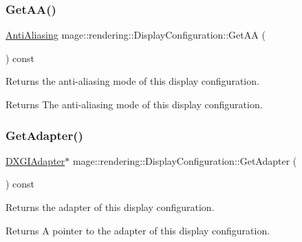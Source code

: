 \subsubsection{\texorpdfstring{Get\+A\+A()}{GetAA()}}
{\footnotesize\ttfamily \mbox{\hyperlink{namespacemage_1_1rendering_ac3f75e49e92b42f2f5fb55c450d8899c}{Anti\+Aliasing}} mage\+::rendering\+::\+Display\+Configuration\+::\+Get\+AA (\begin{DoxyParamCaption}{ }\end{DoxyParamCaption}) const\hspace{0.3cm}{\ttfamily [noexcept]}}

Returns the anti-\/aliasing mode of this display configuration.

\begin{DoxyReturn}{Returns}
The anti-\/aliasing mode of this display configuration. 
\end{DoxyReturn}
\mbox{\label{classmage_1_1rendering_1_1_display_configuration_a8516379377ff3f6cec7b2d705398459f}} 
\subsubsection{\texorpdfstring{Get\+Adapter()}{GetAdapter()}}
{\footnotesize\ttfamily \mbox{\hyperlink{namespacemage_1_1rendering_ad55e028ebd705b547eeb972ad8d03b6a}{D\+X\+G\+I\+Adapter}}$\ast$ mage\+::rendering\+::\+Display\+Configuration\+::\+Get\+Adapter (\begin{DoxyParamCaption}{ }\end{DoxyParamCaption}) const\hspace{0.3cm}{\ttfamily [noexcept]}}

Returns the adapter of this display configuration.

\begin{DoxyReturn}{Returns}
A pointer to the adapter of this display configuration. 
\end{DoxyReturn}
\mbox{\label{classmage_1_1rendering_1_1_display_configuration_a66c6757aa4c17227ab0e7022228f982a}} 
